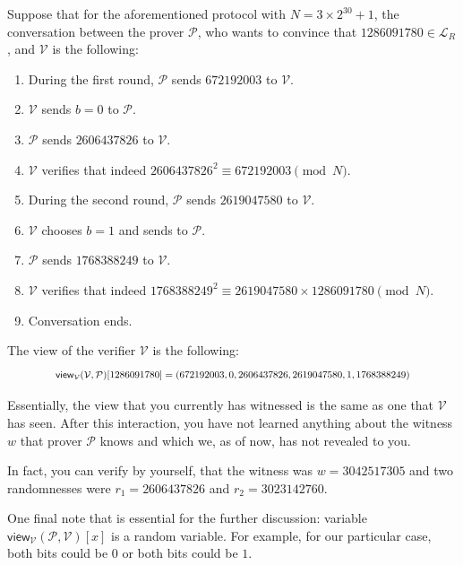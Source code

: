 \documentclass[../lecture-notes.tex]{subfiles}
\begin{document}
\begin{example}
    Suppose that for the aforementioned protocol with $N=3 \times 2^{30} + 1$, the conversation between the prover $\mathcal{P}$, who wants to convince that $1286091780 \in \mathcal{L}_R$, and $\mathcal{V}$ is the following:
    \begin{enumerate}
        \item During the first round, $\mathcal{P}$ sends $672192003$ to $\mathcal{V}$.
        \item $\mathcal{V}$ sends $b=0$ to $\mathcal{P}$.
        \item $\mathcal{P}$ sends $2606437826$ to $\mathcal{V}$.
        \item $\mathcal{V}$ verifies that indeed $2606437826^2 \equiv 672192003 \pmod{N}$.
        \item During the second round, $\mathcal{P}$ sends $2619047580$ to $\mathcal{V}$.
        \item $\mathcal{V}$ chooses $b=1$ and sends to $\mathcal{P}$.
        \item $\mathcal{P}$ sends $1768388249$ to $\mathcal{V}$.
        \item $\mathcal{V}$ verifies that indeed $1768388249^2 \equiv 2619047580 \times 1286091780 \pmod{N}$.
        \item Conversation ends.
    \end{enumerate}

    The view of the verifier $\mathcal{V}$ is the following: 
    \begin{equation*}
        \scalebox{0.8}{
            $\mathsf{view}_{\mathcal{V}}(\mathcal{V}, \mathcal{P})[1286091780] = (672192003, 0, 2606437826, 2619047580, 1, 1768388249)$
        }
    \end{equation*}

    Essentially, the view that you currently has witnessed is the same as one that $\mathcal{V}$ has seen. After this interaction, you have not learned anything about the witness $w$ that prover $\mathcal{P}$ knows and which we, as of now, has not revealed to you.

    In fact, you can verify by yourself, that the witness was $w = 3042517305$ and two randomnesses were $r_1 = 2606437826$ and $r_2 = 3023142760$.

    One final note that is essential for the further discussion: variable $\mathsf{view}_{\mathcal{V}}(\mathcal{P}, \mathcal{V})[x]$ is a random variable. For example, for our particular case, both bits could be $0$ or both bits could be $1$. 
\end{example}
\end{document}
